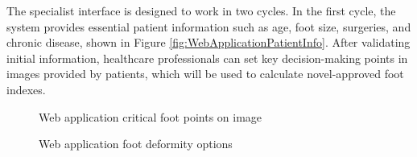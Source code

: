 The specialist interface is designed to work in two cycles. In the first cycle, the system provides essential patient information such as age, foot size, surgeries, and chronic disease, shown in Figure \ref{fig:WebApplicationPatientInfo}. After validating initial information, healthcare professionals can set key decision-making points in images provided by patients, which will be used to calculate novel-approved foot indexes. 

\begin{figure}[htbp]
\centering
{}
\caption{Web application critical foot points on image}
\label{fig:WebApplicationFootPoints}
\end{figure}

\begin{figure}[htbp]
\centering
{}
\caption{Web application foot deformity options}
\label{fig:WebApplicationSetFootDeformity}
\end{figure}

